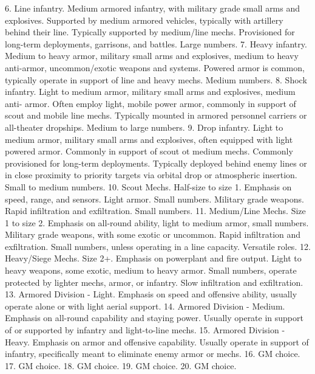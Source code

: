                                                                                                          


    6.  Line infantry. Medium armored infantry, with military grade small arms and explosives.  
        Supported by medium armored vehicles, typically with artillery behind their line. Typically  
        supported by medium/line mechs. Provisioned for long-term deployments, garrisons, and  
        battles. Large numbers.   
    7.  Heavy infantry. Medium to heavy armor, military small arms and explosives, medium to  
        heavy anti-armor, uncommon/exotic weapons and systems. Powered armor is common,  
        typically operate in support of line and heavy mechs. Medium numbers.   
    8.  Shock infantry. Light to medium armor, military small arms and explosives, medium anti- 
        armor. Often employ light, mobile power armor, commonly in support of scout and mobile  
        line mechs. Typically mounted in armored personnel carriers or all-theater dropships.  
        Medium to large numbers.   
    9.  Drop infantry. Light to medium armor, military small arms and explosives, often equipped  
        with light powered armor. Commonly in support of scout ot medium mechs. Commonly  
        provisioned for long-term deployments. Typically deployed behind enemy lines or in close  
        proximity to priority targets via orbital drop or atmospheric insertion. Small to medium  
        numbers.   
    10. Scout Mechs. Half-size to size 1. Emphasis on speed, range, and sensors. Light armor.  
        Small numbers. Military grade weapons. Rapid infiltration and exfiltration. Small numbers.   
    11. Medium/Line Mechs. Size 1 to size 2. Emphasis on all-round ability, light to medium armor,  
        small numbers. Military grade weapons, with some exotic or uncommon. Rapid infiltration  
        and exfiltration. Small numbers, unless operating in a line capacity. Versatile roles.   
    12. Heavy/Siege Mechs. Size 2+. Emphasis on powerplant and fire output. Light to heavy  
        weapons, some exotic, medium to heavy armor. Small numbers, operate protected by  
        lighter mechs, armor, or infantry. Slow infiltration and exfiltration.   
    13. Armored Division - Light. Emphasis on speed and offensive ability, usually operate alone  
        or with light aerial support.    
    14. Armored Division - Medium. Emphasis on all-round capability and staying power. Usually  
        operate in support of or supported by infantry and light-to-line mechs.   
    15. Armored Division - Heavy. Emphasis on armor and offensive capability. Usually operate in  
        support of infantry, specifically meant to eliminate enemy armor or mechs.   
    16. GM choice.  
    17. GM choice.  
    18. GM choice.  
    19. GM choice.  
    20. GM choice.   


